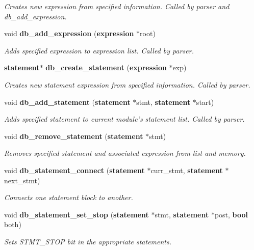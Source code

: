 \begin{CompactItemize}
\begin{CompactList}\small\item\em Creates new expression from specified information. Called by parser and db\_\-add\_\-expression.\item\end{CompactList}\item 
void {\bf db\_\-add\_\-expression} ({\bf expression} $\ast$root)
\begin{CompactList}\small\item\em Adds specified expression to expression list. Called by parser.\item\end{CompactList}\item 
{\bf statement}$\ast$ {\bf db\_\-create\_\-statement} ({\bf expression} $\ast$exp)
\begin{CompactList}\small\item\em Creates new statement expression from specified information. Called by parser.\item\end{CompactList}\item 
void {\bf db\_\-add\_\-statement} ({\bf statement} $\ast$stmt, {\bf statement} $\ast$start)
\begin{CompactList}\small\item\em Adds specified statement to current module's statement list. Called by parser.\item\end{CompactList}\item 
void {\bf db\_\-remove\_\-statement} ({\bf statement} $\ast$stmt)
\begin{CompactList}\small\item\em Removes specified statement and associated expression from list and memory.\item\end{CompactList}\item 
void {\bf db\_\-statement\_\-connect} ({\bf statement} $\ast$curr\_\-stmt, {\bf statement} $\ast$next\_\-stmt)
\begin{CompactList}\small\item\em Connects one statement block to another.\item\end{CompactList}\item 
void {\bf db\_\-statement\_\-set\_\-stop} ({\bf statement} $\ast$stmt, {\bf statement} $\ast$post, {\bf bool} both)
\begin{CompactList}\small\item\em Sets STMT\_\-STOP bit in the appropriate statements.\item\end{CompactList}\item 

\end{CompactItemize}
